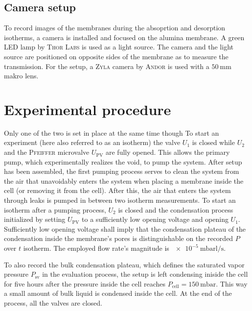 \documentclass[../thesis.tex]{subfiles}
\begin{document}
          


        \subsection{Camera setup}
        \label{subsec:camera-setup}

          To record images of the membranes during the absoprtion and desorption isotherms, a camera is installed and focused on the alumina membrane. A green LED lamp by \textsc{Thor Labs} is used as a light source. The camera and the light source are positioned on opposite sides of the membrane as to measure the transmission. For the setup, a \textsc{Zyla} camera by \textsc{Andor} is used with a $\SI{50}{\milli\meter}$ makro lens.


  \section{Experimental procedure}
  \label{sec:experimental-procedure}
 Only one of the two is set in place at the same time though
    To start an experiment (here also referred to as an isotherm) the valve $U_1$ is closed while $U_2$ and the \textsc{Pfeiffer} microvalve $U_\mathrm{PV}$ are fully opened. This allows the primary pump, which experimentally realizes the void, to pump the system. After setup has been assembled, the first pumping process serves to clean the system from the air that unavoidably enters the system when placing a membrane inside the cell (or removing it from the cell). After this, the air that enters the system through leaks is pumped in between two isotherm measurements. To start an isotherm after a pumping process, $U_2$ is closed and the condensation process initialized by setting $U_\mathrm{PV}$ to a sufficiently low opening voltage and opening $U_1$. Sufficiently low opening voltage shall imply that the condensation plateau of the condensation inside the membrane's pores is distinguishable on the recorded $P$ over $t$ isotherm. The employed flow rate's magnitude is  $\SI{e-5}{\milli\bar\litre\per\second}$.

    To also record the bulk condensation plateau, which defines the saturated vapor pressure $P_\mathrm{sv}$ in the evaluation process, the setup is left condensing iniside the cell for five hours after the pressure inside the cell reaches $P_\mathrm{cell} = \SI{150}{\milli\bar}$. This way a small amount of bulk liquid is condensed inside the cell. At the end of the process, all the valves are closed.
\end{document}
